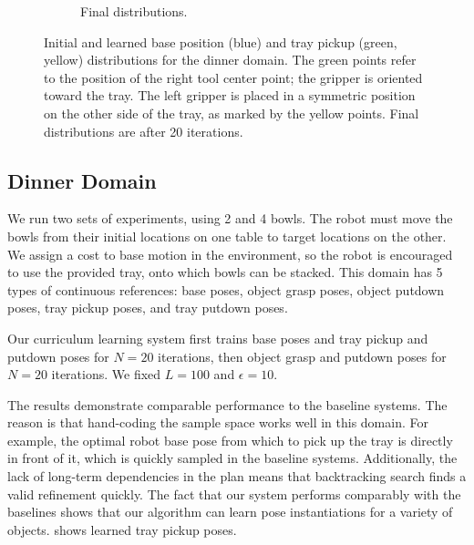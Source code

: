 \begin{figure}[t]
\begin{subfigure}[b]{0.45\linewidth}
    \caption{Final distributions.}
  \end{subfigure}
  \caption{\small{Initial and learned base position (blue) and tray pickup (green, yellow) distributions
for the dinner domain. The green points refer to the position of the right tool center point; the gripper
is oriented toward the tray. The left gripper is placed in a symmetric position on the other side of
the tray, as marked by the yellow points. Final distributions are after 20 iterations.}}
  \label{fig:dinner}
\end{figure}

\subsection{Dinner Domain}
We run two sets of experiments, using 2 and 4 bowls. The robot must move the
bowls from their initial locations on one table to target locations on the other. We assign a cost to
base motion in the environment, so the robot is encouraged to use the provided tray, onto which bowls can be stacked.
This domain has 5 types of continuous references: base poses, object grasp poses, object putdown poses, tray pickup
poses, and tray putdown poses.

Our curriculum learning system first trains base poses and tray pickup and putdown poses for
$N = 20$ iterations, then object grasp and putdown poses for $N = 20$ iterations. We fixed $L = 100$ and $\epsilon = 10$.

The results demonstrate comparable performance to the baseline systems. The reason is that
hand-coding the sample space works well in this domain. For example, the optimal
robot base pose from which to pick up the tray is directly in front of it, which is quickly sampled in
the baseline systems. Additionally, the lack of long-term dependencies in the plan
means that backtracking search finds a valid refinement quickly. The fact that our system performs comparably
with the baselines shows that our algorithm can learn pose instantiations for a variety of objects.
 shows learned tray pickup poses.

